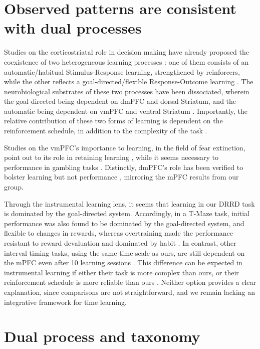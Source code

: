 \section{Observed patterns are consistent with dual processes}
    Studies on the corticostriatal role in decision making have already proposed the coexistence of two heterogeneous learning processes \cite{balleine1998goal, balleine2007role, smith2013dual}: one of them consists of an automatic/habitual Stimulus-Response learning, strengthened by reinforcers, while the other reflects a goal-directed/flexible Response-Outcome learning \cite{dickinson2015instrumental}. The neurobiological substrates of these two processes have been dissociated, wherein the goal-directed being dependent on dmPFC and dorsal Striatum, and the automatic being dependent on vmPFC and ventral Striatum \cite{dickinson2015instrumental}. Importantly, the relative contribution of these two forms of learning is dependent on the reinforcement schedule, in addition to the complexity of the task \cite{dickinson2015instrumental}. 
    
    Studies on the vmPFC's importance to learning, in the field of fear extinction, point out to its role in retaining learning \cite{phelps2004extinction}, while it seems necessary to performance in gambling tasks \cite{rogalsky2012risky}. Distinctly, dmPFC's role has been verified to bolster learning but not performance \cite{balleine2007still}, mirroring the mPFC results from our group.
    
    Through the instrumental learning lens, it seems that learning in our DRRD task is dominated by the goal-directed system. Accordingly, in a T-Maze task, initial performance was also found to be dominated by the goal-directed system, and flexible to changes in rewards, whereas overtraining made the performance resistant to reward devaluation and dominated by habit \cite{smith2013dual}. In contrast, other interval timing tasks, using the same time scale as ours, are still dependent on the mPFC even after 10 learning sessions \cite{narayanan2006reversible}. This difference can be expected in instrumental learning if either their task is more complex than ours, or their reinforcement schedule is more reliable than ours \cite{dickinson2015instrumental}. Neither option provides a clear explanation, since comparisons are not straightforward, and we remain lacking an integrative framework for time learning.

\section{Dual process and taxonomy}

